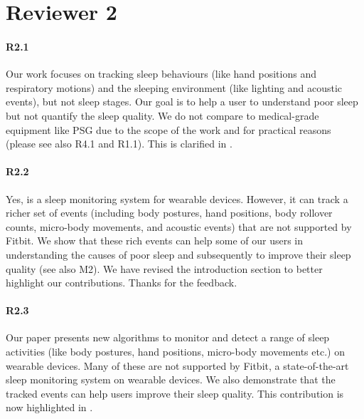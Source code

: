 \section*{Reviewer 2}
\paragraph{R2.1} Our work focuses on tracking sleep behaviours (like hand positions and respiratory motions) and the sleeping environment
(like lighting and acoustic events), but not sleep stages. Our goal is to help a user to understand poor sleep but not quantify the sleep
quality. We do not compare to medical-grade equipment like PSG due to the scope of the work and for practical reasons (please see also R4.1
and R1.1). This is clarified in .

\paragraph{R2.2} Yes, \systemname is a sleep monitoring system for wearable devices. However, it can track a richer set of events
(including body postures, hand positions, body rollover counts, micro-body movements, and acoustic events) that are not supported by
Fitbit. We show that these rich events can help some of our users in understanding the causes of poor sleep and subsequently to improve
their sleep quality (see also M2). We have revised the introduction section to better highlight our contributions. Thanks for the feedback.

\paragraph{R2.3} Our paper presents new algorithms to monitor and detect a range of sleep activities (like body postures, hand positions,
micro-body movements etc.) on wearable devices. Many of these are not supported by Fitbit, a state-of-the-art sleep monitoring system on
wearable devices. We also demonstrate that the tracked events can help users improve their sleep quality. This contribution is now
highlighted in .
